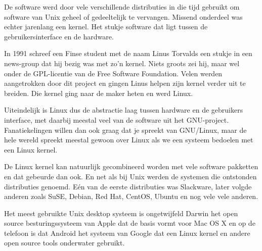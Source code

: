 De software werd door vele verschillende distributies in die tijd gebruikt om software van Unix geheel of gedeeltelijk
te vervangen. Missend onderdeel was echter jarenlang een kernel. Het stukje software dat ligt tussen de
gebruikersinterface en de hardware.\par

In 1991 schreef een Finse student met de naam Linus Torvalds een stukje in een news-group dat hij bezig was met zo'n
kernel. Niets groots zei hij, maar wel onder de GPL-licentie van de Free Software Foundation. Velen werden aangetrokken
door dit project en gingen Linus helpen zijn kernel verder uit te breiden. Die kernel ging naar de maker heten en werd
Linux.\par

Uiteindelijk is Linux dus de abstractie laag tussen hardware en de gebruikers interface, met daarbij meestal veel van de
software uit het GNU-project. Fanatiekelingen willen dan ook graag dat je spreekt van GNU/Linux, maar de hele wereld
spreekt meestal gewoon over Linux als we een systeem bedoelen met een Linux kernel.\par

De Linux kernel kan natuurlijk gecombineerd worden met vele software pakketten en dat gebeurde dan ook. En net als bij
Unix werden de systemen die ontstonden distributies genoemd. E\'en van de eerste distributies was Slackware, later
volgde anderen zoals SuSE, Debian, Red Hat, CentOS, Ubuntu en nog vele vele anderen.\par

Het meest gebruikte Unix desktop systeem is ongetwijfeld Darwin het open source besturingssysteem van Apple dat de basis
vormt voor Mac OS X en op de telefoon is dat Android het systeem van Google dat een Linux kernel en andere open source
tools onderwater gebruikt.\par

